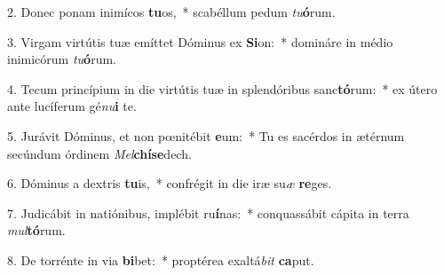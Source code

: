 2. Donec ponam inimícos \textbf{tu}os,~*  scabéllum pedum \textit{tu}\textbf{ó}rum.\

3. Virgam virtútis tuæ emíttet Dóminus ex \textbf{Si}on:~*  domináre in médio inimicórum \textit{tu}\textbf{ó}rum.\

4. Tecum princípium in die virtútis tuæ in splendóribus sanc\textbf{tó}rum:~*  ex útero ante lucíferum gé\textit{nu}\textbf{i} te.\

5. Jurávit Dóminus, et non pœnitébit \textbf{e}um:~*  Tu es sacérdos in ætérnum secúndum órdinem \textit{Mel}\textbf{chí}\textbf{se}dech.\

6. Dóminus a dextris \textbf{tu}is,~*  confrégit in die iræ su\textit{æ} \textbf{re}ges.\

7. Judicábit in natiónibus, implébit ru\textbf{í}nas:~*  conquassábit cápita in terra \textit{mul}\textbf{tó}rum.\

8. De torrénte in via \textbf{bi}bet:~*  proptérea exaltá\textit{bit} \textbf{ca}put.\

